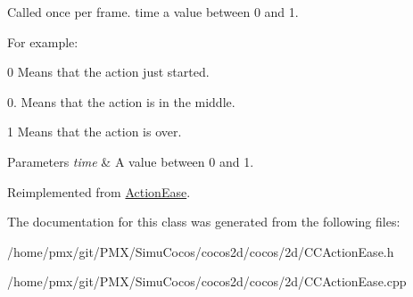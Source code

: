 Called once per frame. time a value between 0 and 1.

For example\+:
\begin{DoxyItemize}
\item 0 Means that the action just started.
\item 0. Means that the action is in the middle.
\item 1 Means that the action is over.
\end{DoxyItemize}


\begin{DoxyParams}{Parameters}
{\em time} & A value between 0 and 1. \\
\hline
\end{DoxyParams}


Reimplemented from \hyperlink{classActionEase_a77679f09c02cf75fb54776470c339fc5}{Action\+Ease}.



The documentation for this class was generated from the following files\+:\begin{DoxyCompactItemize}
\item 
/home/pmx/git/\+P\+M\+X/\+Simu\+Cocos/cocos2d/cocos/2d/C\+C\+Action\+Ease.\+h\item 
/home/pmx/git/\+P\+M\+X/\+Simu\+Cocos/cocos2d/cocos/2d/C\+C\+Action\+Ease.\+cpp\end{DoxyCompactItemize}
